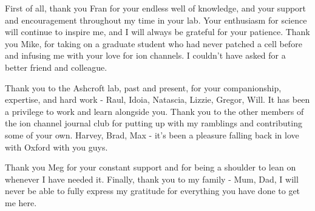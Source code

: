 First of all, thank you Fran for your endless well of knowledge, and your support and encouragement throughout my time in your lab.
Your enthusiasm for science will continue to inspire me, and I will always be grateful for your patience.
Thank you Mike, for taking on a graduate student who had never patched a cell before and infusing me with your love for ion channels.
I couldn't have asked for a better friend and colleague.

Thank you to the Ashcroft lab, past and present, for your companionship, expertise, and hard work - Raul, Idoia, Natascia, Lizzie, Gregor, Will.
It has been a privilege to work and learn alongside you.
Thank you to the other members of the ion channel journal club for putting up with my ramblings and contributing some of your own.
Harvey, Brad, Max - it's been a pleasure falling back in love with Oxford with you guys.

Thank you Meg for your constant support and for being a shoulder to lean on whenever I have needed it.
Finally, thank you to my family - Mum, Dad, I will never be able to fully express my gratitude for everything you have done to get me here.